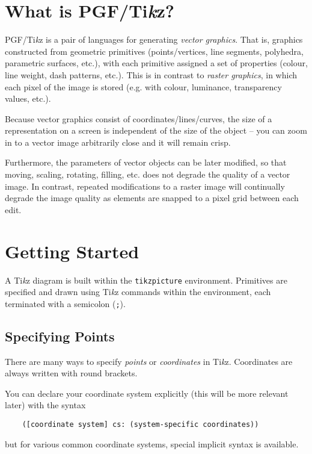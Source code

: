 \documentclass{article}
\theoremstyle{definition}
\theoremstyle{definition}
\theoremstyle{remark}
\newcommand{\Tikz}{Ti\textit{k}z{}}
\begin{document}
\scalebox{0.8}{\theverbbox}

\newpage

\section*{What is PGF/\Tikz{}?}

PGF/\Tikz{} is a pair of languages for generating \textit{vector graphics}. That is, graphics constructed from geometric primitives (points/vertices, line segments, polyhedra, parametric surfaces, etc.), with each primitive assigned a set of properties (colour, line weight, dash patterns, etc.). This is in contrast to \textit{raster graphics}, in which each pixel of the image is stored (e.g. with colour, luminance, transparency values, etc.).

Because vector graphics consist of coordinates/lines/curves, the size of a representation on a screen is independent of the size of the object -- you can zoom in to a vector image arbitrarily close and it will remain crisp.

Furthermore, the parameters of vector objects can be later modified, so that moving, scaling, rotating, filling, etc. does not degrade the quality of a vector image. In contrast, repeated modifications to a raster image will continually degrade the image quality as elements are snapped to a pixel grid between each edit.

\section*{Getting Started}

A \Tikz{} diagram is built within the \verb|tikzpicture| environment. Primitives are specified and drawn using \Tikz{} commands within the environment, each terminated with a semicolon (\verb|;|).


\subsection*{Specifying Points}

There are many ways to specify \textit{points} or \textit{coordinates} in \Tikz{}. Coordinates are always written with round brackets.

You can declare your coordinate system explicitly (this will be more relevant later) with the syntax
\begin{verbatim}
    ([coordinate system] cs: (system-specific coordinates))
\end{verbatim}
but for various common coordinate systems, special implicit syntax is available.
\end{document}

